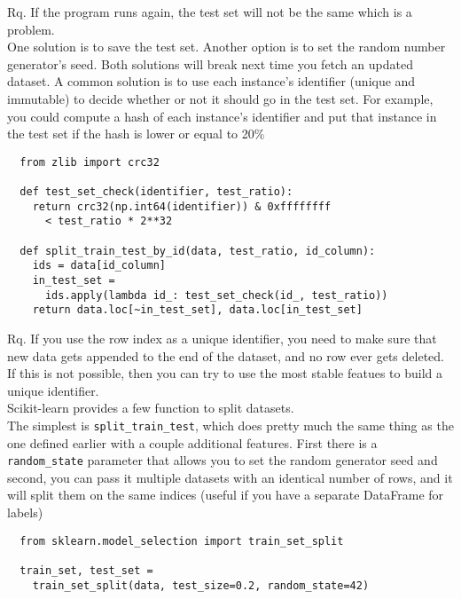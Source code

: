 \documentclass[french]{article}
\begin{document}
Rq. If the program runs again, the test set will not be the same which is a problem.\\
One solution is to save the test set. Another option is to set the random number generator's seed. Both solutions will break next time you fetch an updated dataset. A common solution is to use each instance's identifier (unique and immutable) to decide whether or not it should go in the test set. For example, you could compute a hash of each instance's identifier and put that instance in the test set if the hash is lower or equal to 20\%
\begin{verbatim}
  from zlib import crc32

  def test_set_check(identifier, test_ratio):
    return crc32(np.int64(identifier)) & 0xffffffff
      < test_ratio * 2**32

  def split_train_test_by_id(data, test_ratio, id_column):
    ids = data[id_column]
    in_test_set =
      ids.apply(lambda id_: test_set_check(id_, test_ratio))
    return data.loc[~in_test_set], data.loc[in_test_set]
\end{verbatim}

Rq. If you use the row index as a unique identifier, you need to make sure that new data gets appended to the end of the dataset, and no row ever gets deleted. If this is not possible, then you can try to use the most stable featues to build a unique identifier.\\

Scikit-learn provides a few function to split datasets. \\The simplest is \verb|split_train_test|, which does pretty much the same thing as the one defined earlier with a couple additional features. First there is a \verb|random_state| parameter that allows you to set the random generator seed and second, you can pass it multiple datasets with an identical number of rows, and it will split them on the same indices (useful if you have a separate DataFrame for labels)


\begin{verbatim}
  from sklearn.model_selection import train_set_split

  train_set, test_set =
    train_set_split(data, test_size=0.2, random_state=42)
\end{verbatim}
\end{document}
